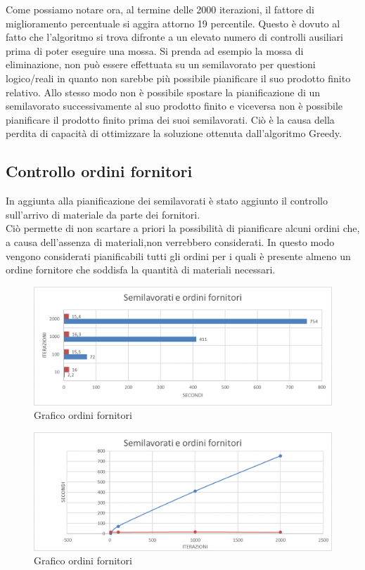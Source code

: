 Come possiamo notare ora, al termine delle 2000 iterazioni, il fattore di miglioramento percentuale si aggira attorno 19 percentile. Questo è dovuto al fatto che l'algoritmo
si trova difronte a un elevato numero di controlli ausiliari prima di poter eseguire una mossa. Si prenda ad esempio la mossa di eliminazione, non può essere effettuata su un semilavorato
per questioni logico/reali in quanto non sarebbe più possibile pianificare il suo prodotto finito relativo. Allo stesso modo non è possibile spostare la pianificazione di un
semilavorato successivamente al suo prodotto finito e viceversa non è possibile pianificare il prodotto finito prima dei suoi semilavorati. Ciò è la causa della perdita di
capacità di ottimizzare la soluzione ottenuta dall'algoritmo Greedy.

\newpage
\subsection{Controllo ordini fornitori}

In aggiunta alla pianificazione dei semilavorati è stato aggiunto il controllo sull'arrivo di materiale da parte dei fornitori.\\Ciò permette di non scartare a priori la possibilità
di pianificare alcuni ordini che, a causa dell'assenza di materiali,non verrebbero considerati. In questo modo vengono considerati pianificabili tutti gli ordini per i quali
è presente almeno un ordine fornitore che soddisfa la quantità di materiali necessari. 

\begin{figure}[H]
	\includegraphics[width=13cm]{immagini/graficofo.png}
	\centering
	\caption{Grafico ordini fornitori}
\end{figure}

\begin{figure}[H]
	\includegraphics[width=13cm]{immagini/graficofo2.png}
	\centering
	\caption{Grafico ordini fornitori}
\end{figure}

